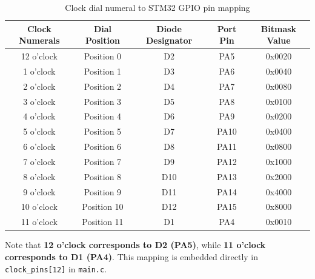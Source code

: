 \documentclass[oneside,final]{hcmut-report}
\begin{document}
\begin{table}[H]
  \vspace{-0.4em}
  \centering
  \footnotesize
  \renewcommand{\arraystretch}{1.05}
  \setlength{\tabcolsep}{3pt}
  \begin{tabularx}{\linewidth}{c c c c >{\ttfamily}c}
    \toprule
    \textbf{Clock Numerals} & \textbf{Dial Position} & \textbf{Diode Designator} & \textbf{Port Pin} & \textbf{Bitmask Value} \\
    \midrule
    12 o'clock & Position 0 & D2 & PA5 & 0x0020 \\
    1 o'clock & Position 1 & D3 & PA6 & 0x0040 \\
    2 o'clock & Position 2 & D4 & PA7 & 0x0080 \\
    3 o'clock & Position 3 & D5 & PA8 & 0x0100 \\
    4 o'clock & Position 4 & D6 & PA9 & 0x0200 \\
    5 o'clock & Position 5 & D7 & PA10 & 0x0400 \\
    6 o'clock & Position 6 & D8 & PA11 & 0x0800 \\
    7 o'clock & Position 7 & D9 & PA12 & 0x1000 \\
    8 o'clock & Position 8 & D10 & PA13 & 0x2000 \\
    9 o'clock & Position 9 & D11 & PA14 & 0x4000 \\
    10 o'clock & Position 10 & D12 & PA15 & 0x8000 \\
    11 o'clock & Position 11 & D1 & PA4 & 0x0010 \\
    \bottomrule
  \end{tabularx}
  \vspace{-0.3em}
  \caption{Clock dial numeral to STM32 GPIO pin mapping}
  \label{tab:clock_map}
  \vspace{-0.5em}
\end{table}

\noindent Note that \textbf{12 o'clock corresponds to D2 (PA5)}, while \textbf{11 o'clock corresponds to D1 (PA4)}. This mapping is embedded directly in \texttt{clock\_pins[12]} in \texttt{main.c}.
\end{document}
